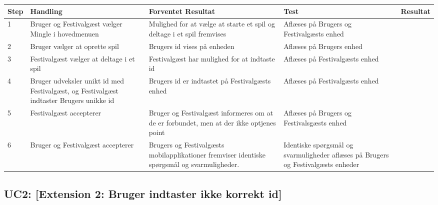 \begin{longtable}{| p{0.7cm}  | p{3cm}  | p{4cm} |  p{3cm}  | p{3cm}  |}
\hline
Step & Handling & Forventet Resultat & Test & Resultat \\
\hline
1 &  Bruger og Festivalgæst vælger Mingle i hovedmenuen &  Mulighed for at vælge at starte et spil og deltage i et spil fremvises  & Aflæses på Brugers og Festivalgæsts enhed & \FuckingHuge{\checkmark} \\
\hline
2 &  Bruger vælger at oprette spil &  Brugers id vises på enheden  & Aflæses på Brugers enhed & \FuckingHuge{\checkmark} \\
\hline
3 &  Festivalgæst vælger at deltage i et spil &  Festivalgæst har mulighed for at indtaste id  & Aflæses på Festivalgæsts enhed & \FuckingHuge{\checkmark} \\
\hline
4 &  Bruger udveksler unikt id med Festivalgæst, og Festivalgæst indtaster Brugers unikke id &  Brugers id er indtastet på Festivalgæsts enhed  & Aflæses på Festivalgæsts enhed & \FuckingHuge{\checkmark} \\
\hline
5 & Festivalgæst accepterer &  Bruger og Festivalgæst informeres om at de er forbundet, men at der ikke optjenes point & Aflæses på Brugers og Festivalsgæsts enhed & \FuckingHuge{\checkmark}\\ 
\hline
6 & Bruger og Festivalgæst accepterer &   Brugers og Festivalgæsts mobilapplikationer fremviser identiske spørgsmål og svarmuligheder. & Identiske spørgsmål og svarmuligheder aflæses på Brugers og Festivalgæsts enheder & \FuckingHuge{\checkmark} \\
\hline
\end{longtable}


\subsection{UC2: [Extension 2: Bruger indtaster ikke korrekt id]}



